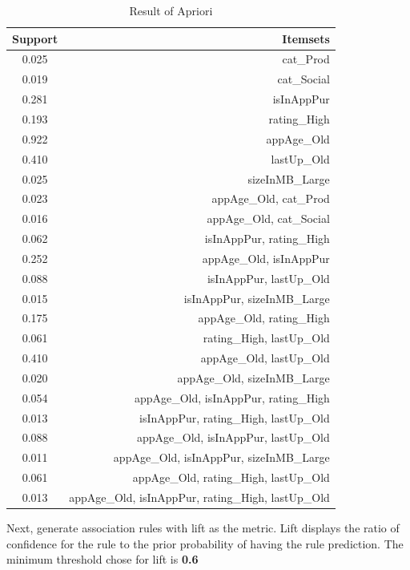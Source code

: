 \begin{table}
\scriptsize
    \centering
    \begin{tabular}{cr}
    \toprule
        Support & Itemsets \\
        \midrule
        0.025 & {cat\_Prod} \\
        0.019 & {cat\_Social} \\
        0.281 & {isInAppPur} \\
        0.193 & {rating\_High} \\
        0.922 & {appAge\_Old} \\
        0.410 & {lastUp\_Old} \\
        0.025 & {sizeInMB\_Large} \\
        0.023 & {appAge\_Old, cat\_Prod} \\
        0.016 & {appAge\_Old, cat\_Social} \\
        0.062 & {isInAppPur, rating\_High} \\
        0.252 & {appAge\_Old, isInAppPur} \\
        0.088 & {isInAppPur, lastUp\_Old} \\
        0.015 & {isInAppPur, sizeInMB\_Large} \\
        0.175 & {appAge\_Old, rating\_High} \\
        0.061 & {rating\_High, lastUp\_Old} \\
        0.410 & {appAge\_Old, lastUp\_Old} \\
        0.020 & {appAge\_Old, sizeInMB\_Large} \\
        0.054 & {appAge\_Old, isInAppPur, rating\_High} \\
        0.013 & {isInAppPur, rating\_High, lastUp\_Old} \\
        0.088 & {appAge\_Old, isInAppPur, lastUp\_Old} \\
        0.011 & {appAge\_Old, isInAppPur, sizeInMB\_Large} \\
        0.061 & {appAge\_Old, rating\_High, lastUp\_Old} \\
        0.013 & {appAge\_Old, isInAppPur, rating\_High, lastUp\_Old} \\
\end{tabular}
    \caption{Result of Apriori}
    \label{tab:apriori}
\end{table}

Next, generate association rules with lift as the metric. Lift displays the ratio of confidence for the rule to the prior probability of having the rule prediction. The minimum threshold chose for lift is \textbf{0.6}

